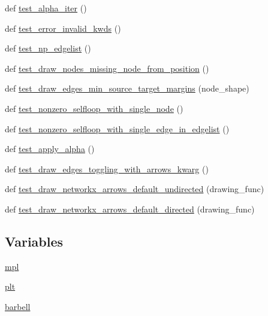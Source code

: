 \begin{DoxyCompactItemize}
def \hyperlink{namespacenetworkx_1_1drawing_1_1tests_1_1test__pylab_a37cffee477a0ef98a2b80112cb8ed840}{test\+\_\+alpha\+\_\+iter} ()
\item 
def \hyperlink{namespacenetworkx_1_1drawing_1_1tests_1_1test__pylab_a5bb144d5f4f5313af0a5a9850ae3c588}{test\+\_\+error\+\_\+invalid\+\_\+kwds} ()
\item 
def \hyperlink{namespacenetworkx_1_1drawing_1_1tests_1_1test__pylab_a451423b92dc921f2abbd53757786ecba}{test\+\_\+np\+\_\+edgelist} ()
\item 
def \hyperlink{namespacenetworkx_1_1drawing_1_1tests_1_1test__pylab_ac5b8daa4caf3a896e2abcbb43fe24682}{test\+\_\+draw\+\_\+nodes\+\_\+missing\+\_\+node\+\_\+from\+\_\+position} ()
\item 
def \hyperlink{namespacenetworkx_1_1drawing_1_1tests_1_1test__pylab_a62582932ed7a0e29f64b40363780375e}{test\+\_\+draw\+\_\+edges\+\_\+min\+\_\+source\+\_\+target\+\_\+margins} (node\+\_\+shape)
\item 
def \hyperlink{namespacenetworkx_1_1drawing_1_1tests_1_1test__pylab_aad09b99b88ce70a2f01874ec386b9137}{test\+\_\+nonzero\+\_\+selfloop\+\_\+with\+\_\+single\+\_\+node} ()
\item 
def \hyperlink{namespacenetworkx_1_1drawing_1_1tests_1_1test__pylab_a96f8f4896a07d7a6cf879e07efcd0c69}{test\+\_\+nonzero\+\_\+selfloop\+\_\+with\+\_\+single\+\_\+edge\+\_\+in\+\_\+edgelist} ()
\item 
def \hyperlink{namespacenetworkx_1_1drawing_1_1tests_1_1test__pylab_ae2245d54c7edfce3f6c149d7285dc1a1}{test\+\_\+apply\+\_\+alpha} ()
\item 
def \hyperlink{namespacenetworkx_1_1drawing_1_1tests_1_1test__pylab_a46987cf8f6ddb24537ba1614734c0a61}{test\+\_\+draw\+\_\+edges\+\_\+toggling\+\_\+with\+\_\+arrows\+\_\+kwarg} ()
\item 
def \hyperlink{namespacenetworkx_1_1drawing_1_1tests_1_1test__pylab_a8760ebb9d5c4bde34b3d4d9c81bd48ad}{test\+\_\+draw\+\_\+networkx\+\_\+arrows\+\_\+default\+\_\+undirected} (drawing\+\_\+func)
\item 
def \hyperlink{namespacenetworkx_1_1drawing_1_1tests_1_1test__pylab_aeb12fe1ae6ada80f8327b2bf680b3426}{test\+\_\+draw\+\_\+networkx\+\_\+arrows\+\_\+default\+\_\+directed} (drawing\+\_\+func)
\end{DoxyCompactItemize}
\subsection*{Variables}
\begin{DoxyCompactItemize}
\item 
\hyperlink{namespacenetworkx_1_1drawing_1_1tests_1_1test__pylab_a36f36135e78dc4a59b8cbf29e991e853}{mpl}
\item 
\hyperlink{namespacenetworkx_1_1drawing_1_1tests_1_1test__pylab_ad77509d68e47c909181d51124930c9df}{plt}
\item 
\hyperlink{namespacenetworkx_1_1drawing_1_1tests_1_1test__pylab_a6e408ad578878f20f5208a5df1de2d62}{barbell}
\end{DoxyCompactItemize}


